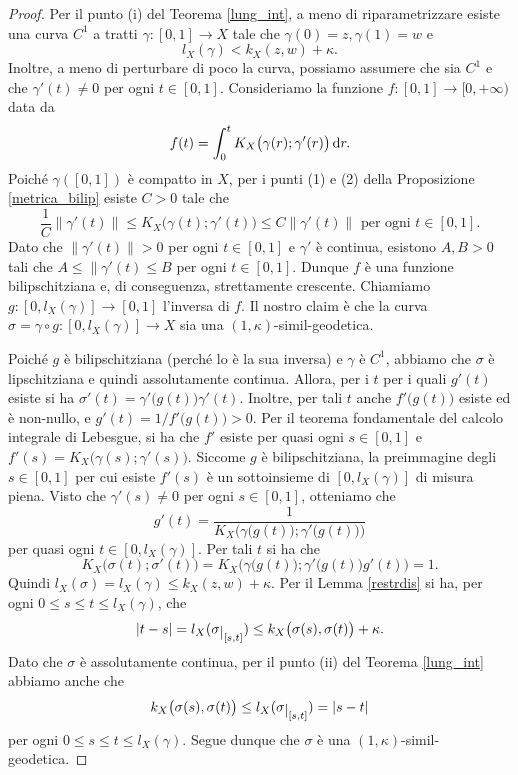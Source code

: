\begin{proof}
    Per il punto (i) del Teorema \ref{lung_int}, a meno di riparametrizzare esiste una curva $C^1$ a tratti $\gamma:[0,1] \longrightarrow X$ tale che $\gamma(0)=z,\gamma(1)=w$ e
    $$l_X(\gamma)<k_X(z,w)+\kappa.$$
    Inoltre, a meno di perturbare di poco la curva, possiamo assumere che sia $C^1$ e che $\gamma'(t)\not=0$ per ogni $t\in[0,1]$. Consideriamo la funzione $f:[0,1] \longrightarrow [0,+\infty)$ data da
    $$f(t)=\int_0^t K_X\big(\gamma(r);\gamma'(r)\big)\mathop{}\!\mathrm{d} r.$$
    Poiché $\gamma([0,1])$ è compatto in $X$, per i punti (1) e (2) della Proposizione \ref{metrica_bilip} esiste $C>0$ tale che
    $$\frac{1}{C}\|\gamma'(t)\| \le K_X\big(\gamma(t);\gamma'(t)\big) \le C\|\gamma'(t)\|\text{ per ogni }t\in[0,1].$$
    Dato che $\|\gamma'(t)\|>0$ per ogni $t\in[0,1]$ e $\gamma'$ è continua, esistono $A,B>0$ tali che $A \le \|\gamma'(t)\le B$ per ogni $t\in[0,1]$. Dunque $f$ è una funzione bilipschitziana e, di conseguenza, strettamente crescente. Chiamiamo $g:[0,l_X(\gamma)] \longrightarrow [0,1]$ l'inversa di $f$. Il nostro claim è che la curva $\sigma=\gamma\circ g:[0,l_X(\gamma)] \longrightarrow X$ sia una $(1,\kappa)$-simil-geodetica.

    Poiché $g$ è bilipschitziana (perché lo è la sua inversa) e $\gamma$ è $C^1$, abbiamo che $\sigma$ è lipschitziana e quindi assolutamente continua. Allora, per i $t$ per i quali $g'(t)$ esiste si ha $\sigma'(t)=\gamma'\big(g(t)\big)\gamma'(t)$. Inoltre, per tali $t$ anche $f'\big(g(t)\big)$ esiste ed è non-nullo, e $g'(t)=1/f'\big(g(t)\big)>0$. Per il teorema fondamentale del calcolo integrale di Lebesgue, si ha che $f'$ esiste per quasi ogni $s\in[0,1]$ e $f'(s)=K_X\big(\gamma(s);\gamma'(s)\big)$. Siccome $g$ è bilipschitziana, la preimmagine degli $s\in[0,1]$ per cui esiste $f'(s)$ è un sottoinsieme di $[0,l_X(\gamma)]$ di misura piena. Visto che $\gamma'(s)\not=0$ per ogni $s\in[0,1]$, otteniamo che
    $$g'(t)=\frac{1}{K_X\Big(\gamma\big(g(t)\big);\gamma'\big(g(t)\big)\Big)}$$
    per quasi ogni $t\in[0,l_X(\gamma)]$. Per tali $t$ si ha che
    $$K_X\big(\sigma(t);\sigma'(t)\big)=K_X\Big(\gamma\big(g(t)\big);\gamma'\big(g(t)\big)g'(t)\Big)=1.$$
    Quindi $l_X(\sigma)=l_X(\gamma) \le k_X(z,w)+\kappa$. Per il Lemma \ref{restrdis} si ha, per ogni $0 \le s \le t \le l_X(\gamma)$, che
    $$|t-s|=l_X(\sigma\restrict{[s,t]}) \le k_X\big(\sigma(s),\sigma(t)\big)+\kappa.$$
    Dato che $\sigma$ è assolutamente continua, per il punto (ii) del Teorema \ref{lung_int} abbiamo anche che
    $$k_X\big(\sigma(s),\sigma(t)\big) \le l_X(\sigma\restrict{[s,t]})=|s-t|$$
    per ogni $0 \le s \le t \le l_X(\gamma)$. Segue dunque che $\sigma$ è una $(1,\kappa)$-simil-geodetica.
\end{proof}

